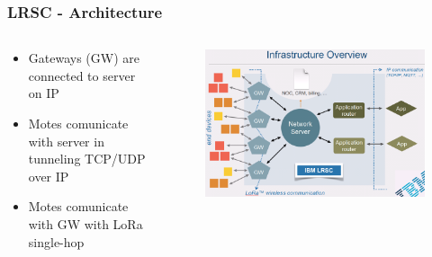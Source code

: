 \documentclass[12pt, compress]{beamer}
\begin{document}
\begin{frame}[fragile]
  \frametitle{LRSC - Architecture}
  \begin{columns}
    \begin{column}{.48\linewidth}
    	\begin{itemize}
	  \item Gateways (GW) are connected to server on IP
	  \item Motes comunicate with server in tunneling TCP/UDP over IP
	  \item Motes comunicate with GW with LoRa single-hop
    	\end{itemize}
    \end{column}
    \hfill
    \begin{column}{.48\linewidth}
    	\begin{figure}
	  \centering
	  \includegraphics[width=\linewidth]{img/LRSC_infrastructure.png}
    	\end{figure}

    \end{column}
  \end{columns}
\end{frame}
\end{document}
